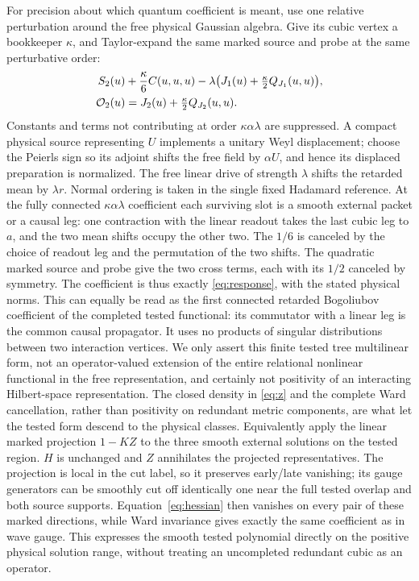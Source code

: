\documentclass[11pt]{article}
\numberwithin{equation}{section}
\begin{document}
For precision about which quantum coefficient is
meant, use one relative perturbation around the free
physical Gaussian algebra. Give its cubic vertex
a bookkeeper \(\kappa\), and Taylor-expand the same
marked source and probe at the same perturbative order:
\begin{align*}
 S_2(u)&+\frac{\kappa}{6}C(u,u,u)
      -\lambda\big(J_1(u)+\tfrac{\kappa}{2}Q_{J_1}(u,u)\big),\\
 {\cal O}_{2}(u)&=J_2(u)+\tfrac{\kappa}{2}Q_{J_2}(u,u).
\end{align*}
Constants and terms not contributing at order
\(\kappa\alpha\lambda\) are suppressed. A compact
physical source representing \(U\) implements a
unitary Weyl displacement; choose the Peierls sign
so its adjoint shifts the free field by \(\alpha U\),
and hence its displaced preparation is normalized.
The free linear drive of strength \(\lambda\)
shifts the retarded mean by \(\lambda r\).
Normal ordering is taken in the single fixed
Hadamard reference. At the fully connected
\(\kappa\alpha\lambda\) coefficient each surviving
slot is a smooth external packet or a causal leg:
one contraction with the linear readout takes the
last cubic leg to \(a\), and the two mean shifts
occupy the other two. The \(1/6\) is canceled by
the choice of readout leg and the permutation of the
two shifts. The quadratic marked source and probe
give the two cross terms, each with its \(1/2\)
canceled by symmetry. The coefficient is thus
exactly \eqref{eq:response}, with the stated
physical norms. This can equally be read as the
first connected retarded Bogoliubov coefficient of
the completed tested functional: its commutator
with a linear leg is the common causal propagator.
It uses no products of singular distributions
between two interaction vertices. We only assert
this finite tested tree multilinear form, not an
operator-valued extension of the entire relational
nonlinear functional in the free representation,
and certainly not positivity of an interacting
Hilbert-space representation. The closed density
in \eqref{eq:z} and the complete Ward cancellation,
rather than positivity on redundant metric
components, are what let the tested form descend
to the physical classes. Equivalently apply the linear marked projection
\(1-KZ\) to the three smooth external solutions on the
tested region. \(H\) is unchanged and \(Z\) annihilates
the projected representatives. The projection is local
in the cut label, so it preserves early/late vanishing;
its gauge generators can be smoothly cut off identically
one near the full tested overlap and both source supports.
Equation~\eqref{eq:hessian} then vanishes on every pair
of these marked directions, while Ward invariance gives
exactly the same coefficient as in wave gauge. This
expresses the smooth tested polynomial directly on the
positive physical solution range, without treating an
uncompleted redundant cubic as an operator.
\end{document}
